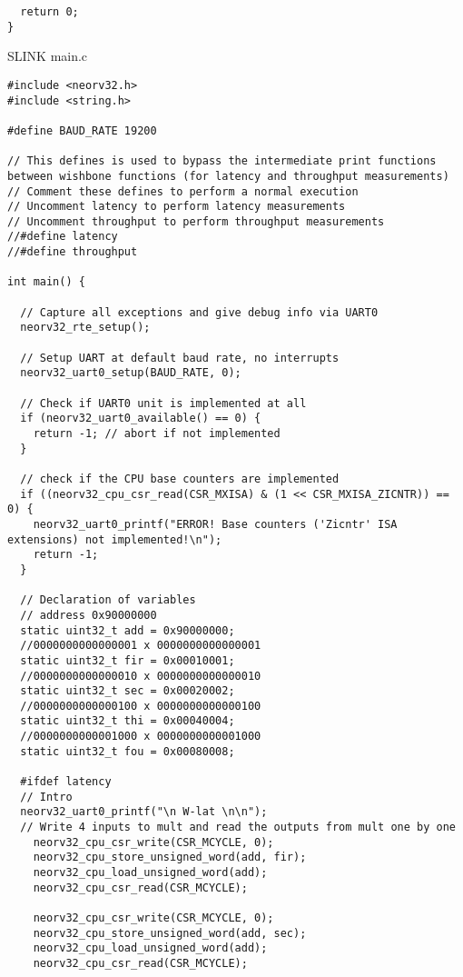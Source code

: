 \begin{code}
\begin{verbatim}
  return 0;
}
\end{verbatim}
\caption{SLINK main.c}
\label{ap-cod:11}
\end{code}

\begin{code}
\begin{verbatim}
#include <neorv32.h>
#include <string.h>

#define BAUD_RATE 19200

// This defines is used to bypass the intermediate print functions between wishbone functions (for latency and throughput measurements)
// Comment these defines to perform a normal execution
// Uncomment latency to perform latency measurements
// Uncomment throughput to perform throughput measurements
//#define latency
//#define throughput

int main() {
    
  // Capture all exceptions and give debug info via UART0
  neorv32_rte_setup();

  // Setup UART at default baud rate, no interrupts
  neorv32_uart0_setup(BAUD_RATE, 0);

  // Check if UART0 unit is implemented at all
  if (neorv32_uart0_available() == 0) {
    return -1; // abort if not implemented
  }

  // check if the CPU base counters are implemented
  if ((neorv32_cpu_csr_read(CSR_MXISA) & (1 << CSR_MXISA_ZICNTR)) == 0) {
    neorv32_uart0_printf("ERROR! Base counters ('Zicntr' ISA extensions) not implemented!\n");
    return -1;
  }

  // Declaration of variables 
  // address 0x90000000
  static uint32_t add = 0x90000000;
  //0000000000000001 x 0000000000000001
  static uint32_t fir = 0x00010001;
  //0000000000000010 x 0000000000000010
  static uint32_t sec = 0x00020002;
  //0000000000000100 x 0000000000000100
  static uint32_t thi = 0x00040004;
  //0000000000001000 x 0000000000001000
  static uint32_t fou = 0x00080008;

  #ifdef latency
  // Intro
  neorv32_uart0_printf("\n W-lat \n\n");
  // Write 4 inputs to mult and read the outputs from mult one by one
    neorv32_cpu_csr_write(CSR_MCYCLE, 0);
    neorv32_cpu_store_unsigned_word(add, fir);
    neorv32_cpu_load_unsigned_word(add);
    neorv32_cpu_csr_read(CSR_MCYCLE); 

    neorv32_cpu_csr_write(CSR_MCYCLE, 0);
    neorv32_cpu_store_unsigned_word(add, sec);
    neorv32_cpu_load_unsigned_word(add);
    neorv32_cpu_csr_read(CSR_MCYCLE); 


\end{verbatim}
\end{code}
